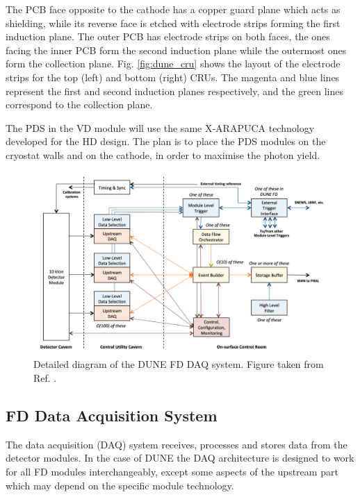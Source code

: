 The PCB face opposite to the cathode has a copper guard plane which acts as shielding, while its reverse face is etched with electrode strips forming the first induction plane. The outer PCB has electrode strips on both faces, the ones facing the inner PCB form the second induction plane while the outermost ones form the collection plane. Fig. \ref{fig:dune_cru} shows the layout of the electrode strips for the top (left) and bottom (right) CRUs. The magenta and blue lines represent the first and second induction planes respectively, and the green lines correspond to the collection plane.

The PDS in the VD module will use the same X-ARAPUCA technology developed for the HD design. The plan is to place the PDS modules on the cryostat walls and on the cathode, in order to maximise the photon yield.


\begin{figure}[t]
	\centering
	\includegraphics[width=0.8\linewidth]{Images/DUNE/FD/DAQ_detailed2}
	\caption[Detailed diagram of the DUNE FD DAQ system.]{Detailed diagram of the DUNE FD DAQ system. Figure taken from Ref. \cite{DUNE2020TDR4}.}
	\label{fig:daq1}
\end{figure}

\subsection{FD Data Acquisition System}

The data acquisition (DAQ) system receives, processes and stores data from the detector modules. In the case of DUNE the DAQ architecture is designed to work for all FD modules interchangeably, except some aspects of the upstream part which may depend on the specific module technology.

